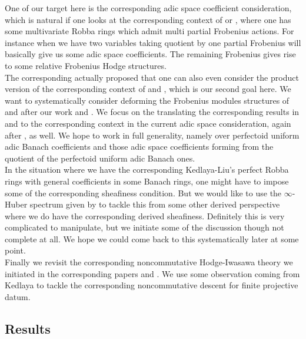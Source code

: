 \documentclass[12pt]{amsart}
\theoremstyle{definition}
\numberwithin{equation}{section}
\begin{document}
\indent One of our target here is the corresponding adic space coefficient consideration, which is natural if one looks at the corresponding context of \cite{CKZ} or \cite{PZ}, where one has some multivariate Robba rings which admit multi partial Frobenius actions. For instance when we have two variables taking quotient by one partial Frobenius will basically give us some adic space coefficients. The remaining Frobenius gives rise to some relative Frobenius Hodge structures. \\


\indent The corresponding \cite{CKZ} actually proposed that one can also even consider the product version of the corresponding context of \cite{KL1} and \cite{KL2}, which is our second goal here. We want to systematically consider deforming the Frobenius modules structures of \cite{KL1} and \cite{KL2} after our work \cite{T1} and \cite{T2}. We focus on the translating the corresponding results in \cite{T1} and \cite{T2} to the corresponding context in the current adic space consideration, again after \cite{KL1}, \cite{KL2} as well. We hope to work in full generality, namely over perfectoid uniform adic Banach coefficients and those adic space coefficients forming from the quotient of the perfectoid uniform adic Banach ones. \\



\indent In the situation where we have the corresponding Kedlaya-Liu's perfect Robba rings with general coefficients in some Banach rings, one might have to impose some of the corresponding sheafiness condition. But we would like to use the $\infty$-Huber spectrum given by \cite{BK} to tackle this from some other derived perspective where we do have the corresponding derived sheafiness. Definitely this is very complicated to manipulate, but we initiate some of the discussion though not complete at all. We hope we could come back to this systematically later at some point.\\

\indent Finally we revisit the corresponding noncommutative Hodge-Iwasawa theory we initiated in the corresponding papers \cite{T1} and \cite{T2}. We use some observation coming from Kedlaya to tackle the corresponding noncommutative descent for finite projective datum.\\


\subsection{Results}
\end{document}
